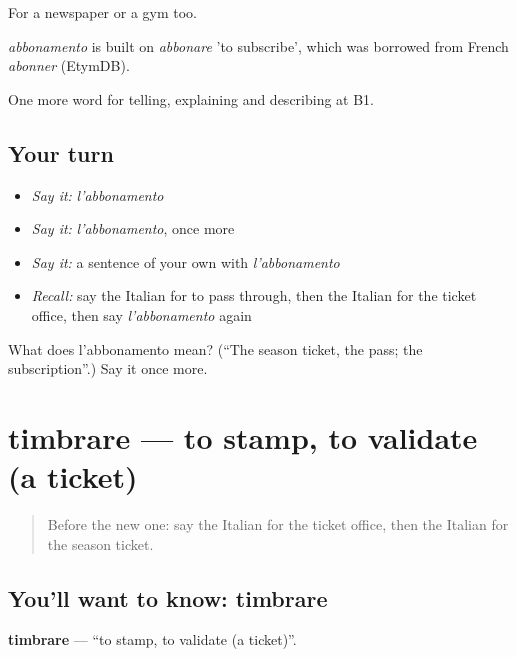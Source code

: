 For a newspaper or a gym too.

\begin{cousinweb}
\emph{abbonamento} is built on \emph{abbonare} 'to subscribe', which was borrowed from French \emph{abonner} (EtymDB).
\end{cousinweb}

\begin{grammarlens}[title={What you've built}]
One more word for telling, explaining and describing at B1.
\end{grammarlens}

\subsection*{Your turn}
\begin{itemize}
\raggedright
  \item \emph{Say it:} \emph{l'abbonamento}
  \item \emph{Say it:} \emph{l'abbonamento}, once more
  \item \emph{Say it:} a sentence of your own with \emph{l'abbonamento}
  \item \emph{Recall:} say the Italian for to pass through, then the Italian for the ticket office, then say \emph{l'abbonamento} again
\end{itemize}

\begin{tcolorbox}[breakable,colback=teal!4,colframe=teal!35!black,title={Before you move on}]
What does l'abbonamento mean? (\textquotedblleft{}The season ticket, the pass; the subscription\textquotedblright{}.) Say it once more.
\end{tcolorbox}
\section[timbrare]{timbrare — to stamp, to validate (a ticket)}

\label{lesson:IT-C418-timbrare}



\begin{quote}
Before the new one: say the Italian for the ticket office, then the Italian for the season ticket.
\end{quote}

\subsection*{You'll want to know: timbrare}
\textbf{timbrare} — \textquotedblleft{}to stamp, to validate (a ticket)\textquotedblright{}.

